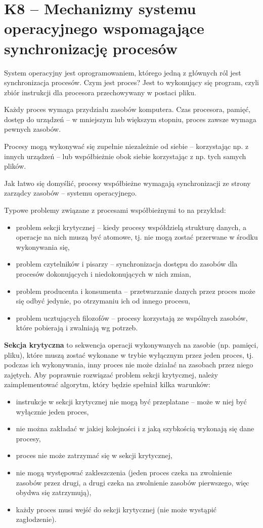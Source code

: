 \sloppy\section{K8 -- Mechanizmy systemu operacyjnego wspomagające synchronizację procesów}

System operacyjny jest oprogramowaniem, którego jedną z głównych ról jest synchronizacja procesów.
Czym jest proces?
Jest to wykonujący się program, czyli zbiór instrukcji dla procesora przechowywany w postaci pliku.

Każdy proces wymaga przydziału zasobów komputera.
Czas procesora, pamięć, dostęp do urządzeń -- w mniejszym lub większym stopniu, proces zawsze wymaga pewnych zasobów.

Procesy mogą wykonywać się zupełnie niezależnie od siebie -- korzystając np. z innych urządzeń -- lub współbieżnie obok siebie korzystając z np. tych samych plików.

Jak łatwo się domyślić, procesy współbieżne wymagają synchronizacji ze strony zarządcy zasobów -- systemu operacyjnego.

Typowe problemy związane z procesami współbieżnymi to na przykład:
\begin{itemize}
\item problem sekcji krytycznej -- kiedy procesy współdzielą strukturę danych, a operacje na nich muszą być atomowe, tj. nie mogą zostać przerwane w środku wykonywania się,
\item problem czytelników i pisarzy -- synchronizacja dostępu do zasobów dla procesów dokonujących i niedokonujących w nich zmian,
\item problem producenta i konsumenta -- przetwarzanie danych przez proces może się odbyć jedynie, po otrzymaniu ich od innego procesu,
\item problem ucztujących filozofów -- procesy korzystają ze wspólnych zasobów, które pobierają i zwalniają wg potrzeb.
\end{itemize}

\textbf{Sekcja krytyczna} to sekwencja operacji wykonywanych na zasobie (np. pamięci, pliku), które muszą zostać wykonane w trybie wyłącznym przez jeden proces, tj. podczas ich wykonywania, inny proces nie może działać na zasobach przez niego zajętych.
Aby poprawnie rozwiązać problem sekcji krytycznej, należy zaimplementować algorytm, który będzie spełniał kilka warunków:
\begin{itemize}
\item instrukcje w sekcji krytycznej nie mogą być przeplatane -- może w niej być wyłącznie jeden proces,
\item nie można zakładać w jakiej kolejności i z jaką szybkością wykonają się dane procesy,
\item proces nie może zatrzymać się w sekcji krytycznej,
\item nie mogą występować zakleszczenia (jeden proces czeka na zwolnienie zasobów przez drugi, a drugi czeka na zwolnienie zasobów pierwszego, więc obydwa się zatrzymują),
\item każdy proces musi wejść do sekcji krytycznej (nie może wystąpić zagłodzenie).
\end{itemize}

